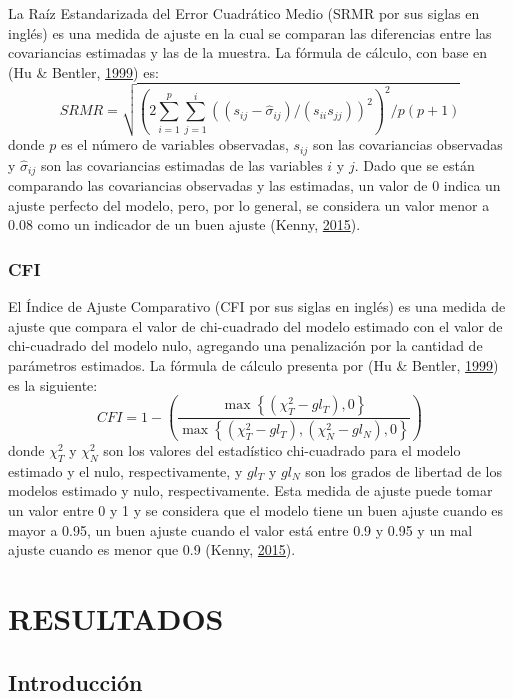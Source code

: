 \documentclass[
]{article}
\begin{document}
La Raíz Estandarizada del Error Cuadrático Medio (SRMR por sus siglas en
inglés) es una medida de ajuste en la cual se comparan las diferencias
entre las covariancias estimadas y las de la muestra. La fórmula de
cálculo, con base en (Hu \& Bentler,
\protect\hyperlink{ref-Hu1999}{1999}) es: \[
  SRMR = \sqrt{\left(2 \sum\limits_{i=1}^p \sum\limits_{j=1}^i \left((s_{ij} - \hat\sigma_{ij}) / (s_{ii} s_{jj}) \right)^2 \right)^2 / p(p+1)}
\] donde \(p\) es el número de variables observadas, \(s_{ij}\) son las
covariancias observadas y \(\hat\sigma_{ij}\) son las covariancias
estimadas de las variables \(i\) y \(j\). Dado que se están comparando
las covariancias observadas y las estimadas, un valor de 0 indica un
ajuste perfecto del modelo, pero, por lo general, se considera un valor
menor a 0.08 como un indicador de un buen ajuste (Kenny,
\protect\hyperlink{ref-Kenny2015}{2015}).

\subsubsection{CFI}

El Índice de Ajuste Comparativo (CFI por sus siglas en inglés) es una
medida de ajuste que compara el valor de chi-cuadrado del modelo
estimado con el valor de chi-cuadrado del modelo nulo, agregando una
penalización por la cantidad de parámetros estimados. La fórmula de
cálculo presenta por (Hu \& Bentler,
\protect\hyperlink{ref-Hu1999}{1999}) es la siguiente: \[
  CFI = 1 - \left( \frac{\max \left\{(\chi^2_T - gl_T), 0  \right\}}{\max \left\{(\chi^2_T - gl_T), (\chi^2_N - gl_N), 0 \right\}} \right)
\] donde \(\chi^2_T\) y \(\chi^2_N\) son los valores del estadístico
chi-cuadrado para el modelo estimado y el nulo, respectivamente, y
\(gl_T\) y \(gl_N\) son los grados de libertad de los modelos estimado y
nulo, respectivamente. Esta medida de ajuste puede tomar un valor entre
0 y 1 y se considera que el modelo tiene un buen ajuste cuando es mayor
a 0.95, un buen ajuste cuando el valor está entre 0.9 y 0.95 y un mal
ajuste cuando es menor que 0.9 (Kenny,
\protect\hyperlink{ref-Kenny2015}{2015}).

\newpage

\section{RESULTADOS}

\subsection{Introducción}
\end{document}
